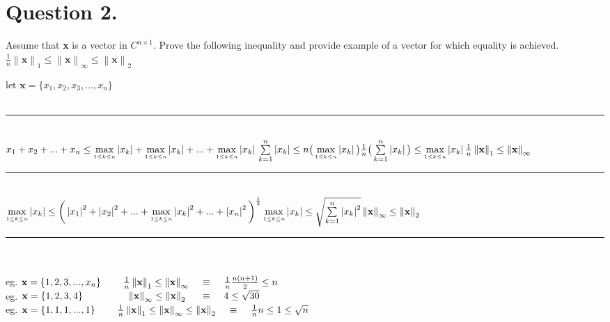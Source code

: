 \documentclass[a4paper,11pt]{article}
\newcommand\tab[1][4mm]{\hspace*{#1}}
\newcommand{\norm}[1]{\left\lVert \mathbf{#1} \right\rVert}
\newcommand{\abs}[1]{\left\vert #1 \right\vert}
\begin{document}
\section*{Question 2.}
Assume that \textbf{x} is a vector in $C^{n\times1}$. Prove the following inequality and provide example of a vector for which equality is achieved. $\frac{1}{n}\norm{x}_1\leq\norm{x}_{\infty}\leq\norm{x}_2$ \\
\begin{margin}{0.5cm}{0.5cm}
let $\mathbf{x}=\{x_1,x_2,x_3,...,x_n\}$ \\\\
\noindent\rule{8cm}{0.4pt} \\
$
x_1 + x_2 + ... + x_n \leq \max\limits_{\mathsmaller{1\leq k\leq n}} \abs{x_k} + \max\limits_{\mathsmaller{1\leq k\leq n}} \abs{x_k} + ... + \max\limits_{\mathsmaller{1\leq k\leq n}} \abs{x_k} \\
\sum\limits_{k=1}^{n}\abs{x_k} \leq n\big(\max\limits_{\mathsmaller{1\leq k\leq n}} \abs{x_k}\big) \\
\frac{1}{n}\big(\sum\limits_{k=1}^{n}\abs{x_k}\big) \leq \max\limits_{\mathsmaller{1\leq k\leq n}} \abs{x_k} \\\\
\frac{1}{n}\norm{x}_1\leq\norm{x}_{\infty}
$
\\
\noindent\rule{8cm}{0.4pt} \\
$
\max\limits_{\mathsmaller{1\leq k\leq n}} \abs{x_k} \leq \bigg(\abs{x_1}^{2}+\abs{x_2}^{2}+...+\max\limits_{\mathsmaller{1\leq k\leq n}} \abs{x_k}^{2}+...+\abs{x_n}^{2} \bigg)^\frac{1}{2} \\
\max\limits_{\mathsmaller{1\leq k\leq n}} \abs{x_k} \leq \sqrt{\sum\limits_{k=1}^{n}\abs{x_k}^{2}} \\\\
\norm{x}_{\infty}\leq\norm{x}_2
$
\\
\noindent\rule{8cm}{0.4pt} \\
\\
eg. $\mathbf{x}=\{1,2,3,...,x_n\} \tab\tab \frac{1}{n}\norm{x}_1\leq\norm{x}_{\infty}\tab\equiv\tab \frac{1}{n}\frac{n(n+1)}{2}\leq n $ \\
eg. $\mathbf{x}=\{1,2,3, 4\} \tab\tab\tab\tab \norm{x}_{\infty}\leq\norm{x}_{2}\tab\ \equiv\tab 4\leq \sqrt{30} $ \\
eg. $\mathbf{x}=\{1,1,1,...,1\} \tab\tab \frac{1}{n}\norm{x}_1\leq\norm{x}_{\infty}\leq\norm{x}_{2}\tab\equiv\tab \frac{1}{n}n\leq 1 \leq \sqrt{n} $ \\
\end{margin}
\end{document}
